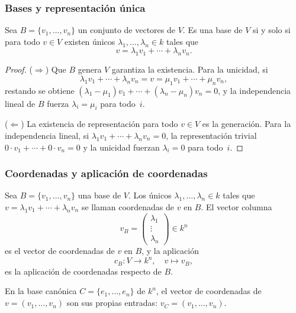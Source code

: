 \begin{frame}[allowframebreaks, t]
    \frametitle{Bases y representación única}

    \begin{theorem}
        Sea $B=\{v_1,\ldots,v_n\}$ un conjunto de vectores de $V$.
        Es una base de $V$ si y solo si para todo $v\in V$ existen
        \alert{únicos} $\lambda_1,\ldots,\lambda_n\in k$ tales que
        \[
            v=\lambda_1v_1+\cdots+\lambda_nv_n.
        \]
    \end{theorem}

    \begin{proof}
        ($\Rightarrow$)
        Que $B$ genera $V$ garantiza la existencia.
        Para la unicidad, si
        \[
            \lambda_1v_1+\cdots+\lambda_nv_n
            =v
            =\mu_1v_1+\cdots+\mu_nv_n,
        \]
        restando se obtiene
        $(\lambda_1-\mu_1)v_1+\cdots+(\lambda_n-\mu_n)v_n=0$,
        y la independencia lineal de $B$ fuerza $\lambda_i=\mu_i$
        para todo~$i$.

        ($\Leftarrow$)
        La existencia de representación para todo $v\in V$ es la generación.
        Para la independencia lineal, si
        $\lambda_1v_1+\cdots+\lambda_nv_n=0$,
        la representación trivial $0\cdot v_1+\cdots+0\cdot v_n=0$
        y la unicidad fuerzan $\lambda_i=0$ para todo~$i$.
    \end{proof}
\end{frame}


\begin{frame}
    \frametitle{Coordenadas y aplicación de coordenadas}

    \begin{definition}
        Sea $B=\{v_1,\ldots,v_n\}$ una base de $V$.
        Los únicos $\lambda_1,\ldots,\lambda_n\in k$ tales que
        $v=\lambda_1v_1+\cdots+\lambda_nv_n$
        se llaman \alert{coordenadas} de $v$ en $B$.
        El vector columna
        \[
            v_B=
            \begin{pmatrix}
                \lambda_1\\\vdots\\\lambda_n
            \end{pmatrix}
            \in k^n
        \]
        es el \alert{vector de coordenadas} de $v$ en $B$,
        y la aplicación
        \[
            c_B\colon V\longrightarrow k^n,\quad v\longmapsto v_B,
        \]
        es la \alert{aplicación de coordenadas} respecto de $B$.
    \end{definition}

    \medskip

    En la base canónica $C=\{e_1,\ldots,e_n\}$ de $k^n$,
    el vector de coordenadas de $v=(v_1,\ldots,v_n)$
    son sus propias entradas: $v_C=(v_1,\ldots,v_n) $.
\end{frame}


